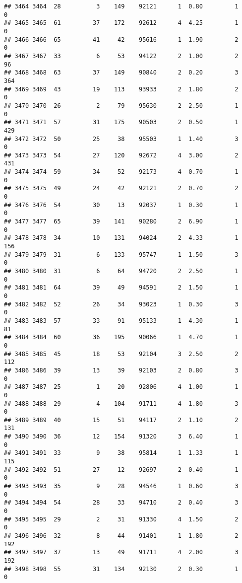 \documentclass[
]{article}
\begin{document}
\begin{verbatim}
## 3464 3464  28          3    149    92121      1  0.80         1        0
## 3465 3465  61         37    172    92612      4  4.25         1        0
## 3466 3466  65         41     42    95616      1  1.90         2        0
## 3467 3467  33          6     53    94122      2  1.00         2       96
## 3468 3468  63         37    149    90840      2  0.20         3      364
## 3469 3469  43         19    113    93933      2  1.80         2        0
## 3470 3470  26          2     79    95630      2  2.50         1        0
## 3471 3471  57         31    175    90503      2  0.50         1      429
## 3472 3472  50         25     38    95503      1  1.40         3        0
## 3473 3473  54         27    120    92672      4  3.00         2      431
## 3474 3474  59         34     52    92173      4  0.70         1        0
## 3475 3475  49         24     42    92121      2  0.70         2        0
## 3476 3476  54         30     13    92037      1  0.30         1        0
## 3477 3477  65         39    141    90280      2  6.90         1        0
## 3478 3478  34         10    131    94024      2  4.33         1      156
## 3479 3479  31          6    133    95747      1  1.50         3        0
## 3480 3480  31          6     64    94720      2  2.50         1        0
## 3481 3481  64         39     49    94591      2  1.50         1        0
## 3482 3482  52         26     34    93023      1  0.30         3        0
## 3483 3483  57         33     91    95133      1  4.30         1       81
## 3484 3484  60         36    195    90066      1  4.70         1        0
## 3485 3485  45         18     53    92104      3  2.50         2      112
## 3486 3486  39         13     39    92103      2  0.80         3        0
## 3487 3487  25          1     20    92806      4  1.00         1        0
## 3488 3488  29          4    104    91711      4  1.80         3        0
## 3489 3489  40         15     51    94117      2  1.10         2      131
## 3490 3490  36         12    154    91320      3  6.40         1        0
## 3491 3491  33          9     38    95814      1  1.33         1      115
## 3492 3492  51         27     12    92697      2  0.40         1        0
## 3493 3493  35          9     28    94546      1  0.60         3        0
## 3494 3494  54         28     33    94710      2  0.40         3        0
## 3495 3495  29          2     31    91330      4  1.50         2        0
## 3496 3496  32          8     44    91401      1  1.80         2      192
## 3497 3497  37         13     49    91711      4  2.00         3      192
## 3498 3498  55         31    134    92130      2  0.30         1        0

\end{verbatim}
\end{document}
